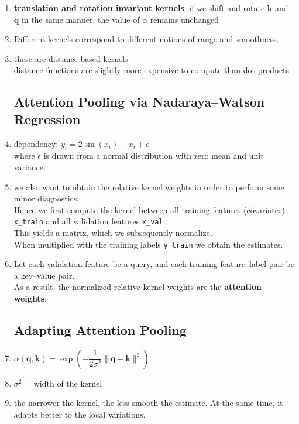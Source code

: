 \begin{enumerate}[itemsep=0.15cm]
    \item \textbf{translation and rotation invariant kernels}: if we shift and rotate $\mathbf{k}$ and $\mathbf{q}$ in the same manner, the value of $\alpha$ remains unchanged

    \item Different kernels correspond to different notions of range and smoothness.

    \item these are distance-based kernels\\
    distance functions are slightly more expensive to compute than dot products

\subsection{Attention Pooling via Nadaraya–Watson Regression \cite{dnn-1}}

    \item dependency: $y_i = 2\sin(x_i) + x_i + \epsilon$\\
    where $\epsilon$ is drawn from a normal distribution with zero mean and unit variance.

    \item we also want to obtain the relative kernel weights in order to perform some minor diagnostics.\\
    Hence we first compute the kernel between all training features (covariates) \verb|x_train| and all validation features \verb|x_val|.\\
    This yields a matrix, which we subsequently normalize.\\
    When multiplied with the training labels \verb|y_train| we obtain the estimates.

    \item Let each validation feature be a query, and each training feature–label pair be a key–value pair.\\
    As a result, the normalized relative kernel weights are the \textbf{attention weights}.

\subsection{Adapting Attention Pooling \cite{dnn-1}}

    \item $\alpha(\mathbf{q}, \mathbf{k}) = \exp\left(-\dfrac{1}{2 \sigma^2} \|\mathbf{q} - \mathbf{k}\|^2 \right)$

    \item $\sigma^2$ = width of the kernel

    \item the narrower the kernel, the less smooth the estimate. At the same time, it adapts better to the local variations.
    
\end{enumerate}


